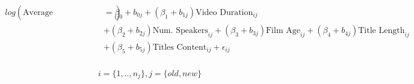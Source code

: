 \begin{align}
\begin{split}
log(\text{Average Num.Views/Day}_{ij})&=\beta_0+b_{0j}+(\beta_1+b_{1j})\text{Video Duration}_{ij}\\
&+(\beta_2+b_{2j})\text{Num. Speakers}_{ij}+(\beta_3+b_{3j})\text{Film Age}_{ij}+(\beta_4+b_{4j})\text{Title Length}_{ij}\\
&+(\beta_5+b_{5j})\text{Titles Content}_{ij}+\epsilon_{ij}\\
\end{split}
\label{poisson_mixed_times_eqn}
\end{align}

\begin{equation*}
i=\{1,..,n_j\}, j=\{old, new\}
\end{equation*}